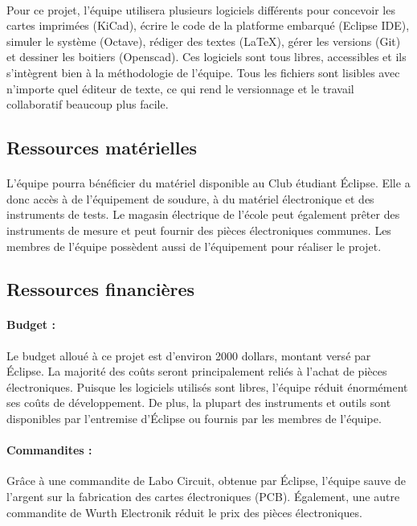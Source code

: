 	\paragraph{}
	Pour ce projet, l'équipe utilisera plusieurs logiciels différents pour concevoir les cartes imprimées (KiCad), écrire le code de la platforme embarqué (Eclipse IDE), simuler le système (Octave), rédiger des textes (LaTeX), gérer les versions (Git) et dessiner les boitiers (Openscad). Ces logiciels sont tous libres, accessibles et ils s'intègrent bien à la méthodologie de l'équipe. Tous les fichiers sont lisibles avec n'importe quel éditeur de texte, ce qui rend le versionnage et le travail collaboratif beaucoup plus facile.
	
	
	\subsection{Ressources matérielles}
	\paragraph{}
	L'équipe pourra bénéficier du matériel disponible au Club étudiant Éclipse. Elle a donc accès à de l'équipement de soudure, à du matériel électronique et des instruments de tests. Le magasin électrique de l'école peut également prêter des instruments de mesure et peut fournir des pièces électroniques communes. Les membres de l'équipe possèdent aussi de l'équipement pour réaliser le projet.
	
	\subsection{Ressources financières}
	
		\paragraph{Budget :}
		Le budget alloué à ce projet est d'environ 2000 dollars, montant versé par Éclipse. La majorité des coûts seront principalement reliés à l'achat de pièces électroniques. Puisque les logiciels utilisés sont libres, l'équipe réduit énormément ses coûts de développement. De plus, la plupart des instruments et outils sont disponibles par l'entremise d'Éclipse ou fournis par les membres de l'équipe.
		
		\paragraph{Commandites :}
		Grâce à une commandite de Labo Circuit, obtenue par Éclipse, l'équipe sauve de l'argent sur la fabrication des cartes électroniques (PCB). Également, une autre commandite de Wurth Electronik réduit le prix des pièces électroniques.
